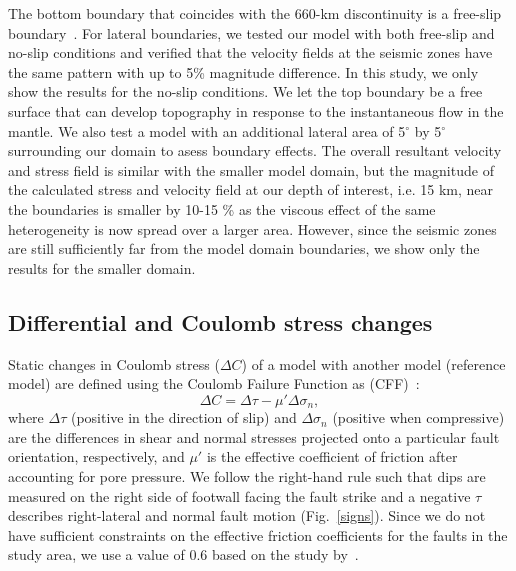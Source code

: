 \documentclass[draft,linenumbers]{agujournal2018}
\begin{document}
The bottom boundary that coincides with the 660-km discontinuity is a free-slip boundary~\citep[e.g.,][]{arcay2007slab, billen2007rheologic, quinquis2011role}. For lateral boundaries, we tested our model with both free-slip and no-slip conditions and verified that the velocity fields at the seismic zones have the same pattern with up to 5\% magnitude difference. In this study, we only show the results for the no-slip conditions. We let the top boundary be a free surface
that can develop topography in response to the instantaneous flow in the mantle. We also test a model with an additional lateral area of 5$^{\circ}$ by 5$^{\circ}$ surrounding our domain to asess boundary effects. The overall resultant velocity and stress field is similar with the smaller model domain, but the magnitude of the calculated stress and velocity field at our depth of interest, i.e. 15 km, near the boundaries is smaller by 10-15 \% as the viscous effect of the same heterogeneity is now spread over a larger area. However, since the seismic zones are still sufficiently far from the model domain boundaries, we show only the results for the smaller domain.

\subsection{Differential and Coulomb stress changes}
Static changes in Coulomb stress ($\Delta C$) of a model with another model (reference model) are defined using the Coulomb Failure Function as (CFF)~\citep{king1994static}:
%
\begin{equation}
    \Delta C = \Delta \tau - \mu' \Delta \sigma_n,
\end{equation}
%
where $\Delta \tau$ (positive in the direction of slip) and $\Delta\sigma_n$ (positive when compressive) are the differences in shear and normal stresses projected onto a particular fault orientation, respectively, and $\mu'$ is the effective coefficient of friction after accounting for pore pressure. We follow the right-hand rule such that dips are measured on the right side of footwall facing the fault strike and a negative $\tau$ describes right-lateral and normal fault motion (Fig.~\ref{signs}).
Since we do not have sufficient constraints on the effective friction coefficients for the faults in the study area, we use a value of 0.6 based on the study by~\citet{hurd2012intraplate}. 
	
\end{document}
